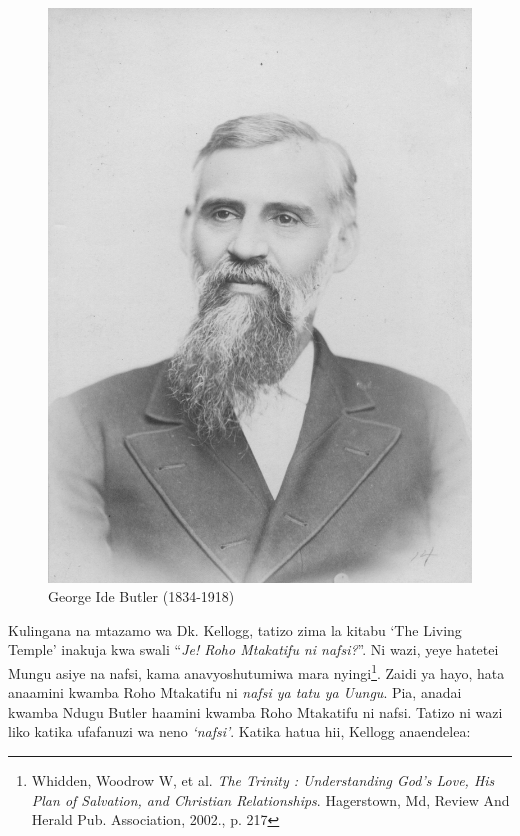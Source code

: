\begin{figure}[hp]
    \centering
    \includegraphics[width=1\linewidth]{images/george-ide-butler.jpg}
    \caption*{George Ide Butler (1834-1918)}
    \label{fig:g-i-butler}
\end{figure}

Kulingana na mtazamo wa Dk. Kellogg, tatizo zima la kitabu ‘The Living Temple’ inakuja kwa swali “\textit{Je! Roho Mtakatifu ni nafsi?}”. Ni wazi, yeye hatetei Mungu asiye na nafsi, kama anavyoshutumiwa mara nyingi\footnote{Whidden, Woodrow W, et al. \textit{The Trinity : Understanding God's Love, His Plan of Salvation, and Christian Relationships}. Hagerstown, Md, Review And Herald Pub. Association, 2002., p. 217}. Zaidi ya hayo, hata anaamini kwamba Roho Mtakatifu ni \textit{nafsi ya tatu ya Uungu}. Pia, anadai kwamba Ndugu Butler haamini kwamba Roho Mtakatifu ni nafsi. Tatizo ni wazi liko katika ufafanuzi wa neno \textit{‘nafsi’}. Katika hatua hii, Kellogg anaendelea:


